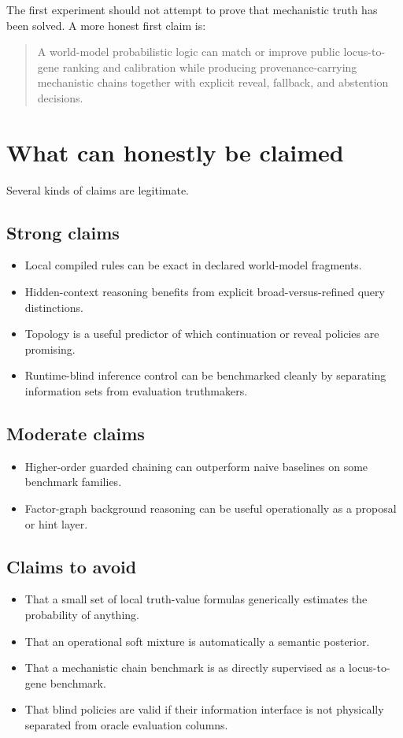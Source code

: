 \documentclass[11pt]{article}
\begin{document}
The first experiment should not attempt to prove that mechanistic truth has been solved. A more honest first claim is:
\begin{quote}
A world-model probabilistic logic can match or improve public locus-to-gene ranking and calibration while producing provenance-carrying mechanistic chains together with explicit reveal, fallback, and abstention decisions.
\end{quote}

\section{What can honestly be claimed}
Several kinds of claims are legitimate.

\subsection*{Strong claims}
\begin{itemize}
    \item Local compiled rules can be exact in declared world-model fragments.
    \item Hidden-context reasoning benefits from explicit broad-versus-refined query distinctions.
    \item Topology is a useful predictor of which continuation or reveal policies are promising.
    \item Runtime-blind inference control can be benchmarked cleanly by separating information sets from evaluation truthmakers.
\end{itemize}

\subsection*{Moderate claims}
\begin{itemize}
    \item Higher-order guarded chaining can outperform naive baselines on some benchmark families.
    \item Factor-graph background reasoning can be useful operationally as a proposal or hint layer.
\end{itemize}

\subsection*{Claims to avoid}
\begin{itemize}
    \item That a small set of local truth-value formulas generically estimates the probability of anything.
    \item That an operational soft mixture is automatically a semantic posterior.
    \item That a mechanistic chain benchmark is as directly supervised as a locus-to-gene benchmark.
    \item That blind policies are valid if their information interface is not physically separated from oracle evaluation columns.
\end{itemize}
\end{document}
